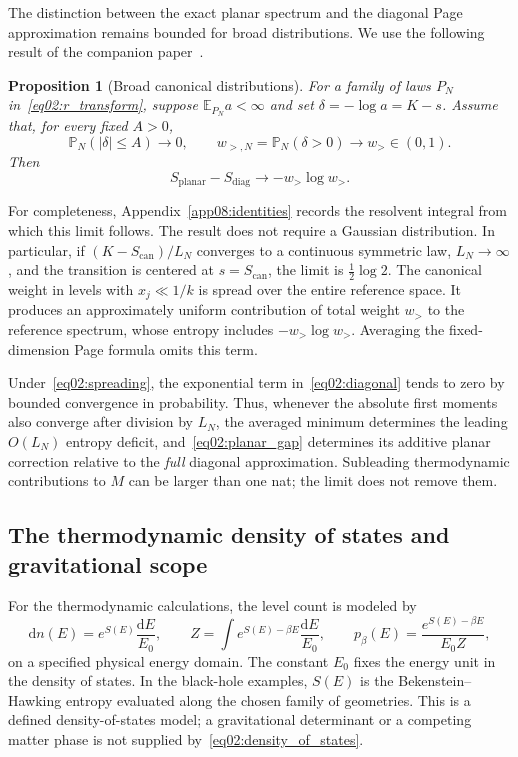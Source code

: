 \documentclass[11pt,letterpaper]{article}
\newcommand{\E}{\mathbb{E}}
\newcommand{\Prob}{\mathbb{P}}
\newcommand{\dd}{\mathrm{d}}
\theoremstyle{plain}
\newtheorem{proposition}[theorem]{Proposition}
\theoremstyle{definition}
\theoremstyle{remark}
\begin{document}
The distinction between the exact planar spectrum and the diagonal Page approximation remains bounded for broad distributions. We use the following result of the companion paper~\cite{wuebben2026}.

\begin{proposition}[Broad canonical distributions]
\label{prop02:spreading}
For a family of laws $P_N$ in~\eqref{eq02:r_transform}, suppose $\E_{P_N}a<\infty$ and set $\delta=-\log a=K-s$. Assume that, for every fixed $A>0$,
\begin{equation}
 \Prob_N(|\delta|\leq A)\longrightarrow0,
 \qquad
 w_{>,N}=\Prob_N(\delta>0)\longrightarrow w_>\in(0,1).
 \label{eq02:spreading}
\end{equation}
Then
\begin{equation}
 S_{\mathrm{planar}}-S_{\mathrm{diag}}
 \longrightarrow -w_>\log w_>.
 \label{eq02:planar_gap}
\end{equation}
\end{proposition}

For completeness, Appendix~\ref{app08:identities} records the resolvent integral from which this limit follows. The result does not require a Gaussian distribution. In particular, if $(K-S_{\mathrm{can}})/L_N$ converges to a continuous symmetric law, $L_N\to\infty$, and the transition is centered at $s=S_{\mathrm{can}}$, the limit is $\tfrac12\log2$. The canonical weight in levels with $x_j\ll1/k$ is spread over the entire reference space. It produces an approximately uniform contribution of total weight $w_>$ to the reference spectrum, whose entropy includes $-w_>\log w_>$. Averaging the fixed-dimension Page formula omits this term.

Under~\eqref{eq02:spreading}, the exponential term in~\eqref{eq02:diagonal} tends to zero by bounded convergence in probability. Thus, whenever the absolute first moments also converge after division by $L_N$, the averaged minimum determines the leading $O(L_N)$ entropy deficit, and~\eqref{eq02:planar_gap} determines its additive planar correction relative to the \emph{full} diagonal approximation. Subleading thermodynamic contributions to $M$ can be larger than one nat; the limit does not remove them.

\subsection{The thermodynamic density of states and gravitational scope}

For the thermodynamic calculations, the level count is modeled by
\begin{equation}
 \dd n(E)=e^{S(E)}\frac{\dd E}{E_0},\qquad
 Z=\int e^{S(E)-\beta E}\frac{\dd E}{E_0},\qquad
 p_\beta(E)=\frac{e^{S(E)-\beta E}}{E_0Z},
 \label{eq02:density_of_states}
\end{equation}
on a specified physical energy domain. The constant $E_0$ fixes the energy unit in the density of states. In the black-hole examples, $S(E)$ is the Bekenstein--Hawking entropy evaluated along the chosen family of geometries. This is a defined density-of-states model; a gravitational determinant or a competing matter phase is not supplied by~\eqref{eq02:density_of_states}.
\end{document}
